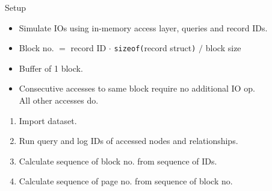 \documentclass[rgb]{beamer}
\begin{document}
\begin{frame}[allowframebreaks]{Setup}
            \begin{itemize}
            \item Simulate IOs using in-memory access layer, queries and record IDs. \\ [1em]
            \item Block no. $=$ record ID $\cdot$ \texttt{sizeof(}record struct\texttt{)} $/$ block size \\  [1em]
            \item Buffer of 1 block.  \\ [1em]
            \item Consecutive accesses to same block require no additional IO op. \\ All other accesses do. \\ [2em]
            \end{itemize}
            \begin{enumerate}
                \item Import dataset.
                \item Run query and log IDs of accessed nodes and relationships.
                \item Calculate sequence of block no. from sequence of IDs.
                \item Calculate sequence of page no. from sequence of block no.
               \end{enumerate}
        \end{frame}
        
\end{document}
